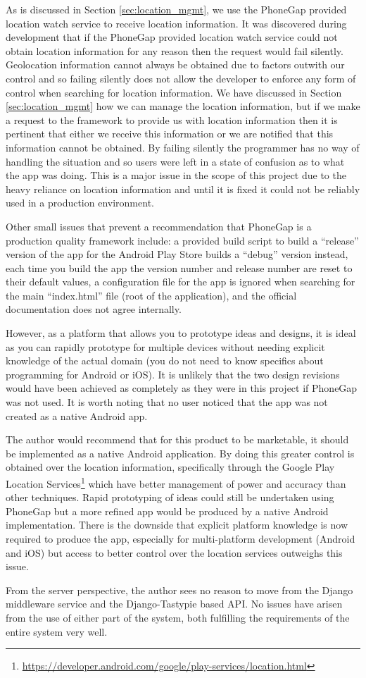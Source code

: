 As is discussed in Section \ref{sec:location_mgmt}, we use the PhoneGap
provided location watch service to receive location information. It
was discovered during development that if the PhoneGap provided
location watch service could not obtain location information for any
reason then the request would fail silently. Geolocation information
cannot always be obtained due to factors outwith our control and so
failing silently does not allow the developer to enforce any form of
control when searching for location information. We have discussed in
Section \ref{sec:location_mgmt} how we can manage the location
information, but if we make a request to the framework to provide us
with location information then it is pertinent that either we receive
this information or we are notified that this information cannot be
obtained. By failing silently the programmer has no way of handling
the situation and so users were left in a state of confusion as to
what the app was doing. This is a major issue in the scope of this
project due to the heavy reliance on location information and until it
is fixed it could not be reliably used in a production environment. 

Other small issues that prevent a recommendation that PhoneGap is a 
production quality framework include: a provided build script to build
a ``release'' version of the app for the Android Play Store builds a
``debug'' version instead, each time you build the app the version
number and release number are reset to their default values, a
configuration file for the app is ignored when searching for the main
``index.html'' file (root of the application), and the official
documentation does not agree internally\cite{phonegap_install,
  phonegap_cli, phonegap_geolocationAccessingFeature}.

However, as a platform that allows you to prototype ideas and designs,
it is ideal as you can rapidly prototype for multiple devices without
needing explicit knowledge of the actual domain (you do not need to
know specifics about programming for Android or iOS). It is unlikely
that the two design revisions would have been achieved as completely
as they were in this project if PhoneGap was not used. It is worth
noting that no user noticed that the app was not created as a native
Android app.

The author would recommend that for this product to be marketable, it
should be implemented as a native Android application. By doing this
greater control is obtained over the location information,
specifically through the Google Play Location
Services\footnote{\url{https://developer.android.com/google/play-services/location.html}}
which have better management of power and accuracy than other
techniques. Rapid prototyping of ideas could still be undertaken using
PhoneGap but a more refined app would be produced by a native Android
implementation. There is the downside that explicit platform knowledge
is now required to produce the app, especially for multi-platform
development (Android and iOS) but access to better control over the
location services outweighs this issue. 

From the server perspective, the author sees no reason to move from
the Django middleware service and the Django-Tastypie based API. No
issues have arisen from the use of either part of the system, both
fulfilling the requirements of the entire system very well. 
